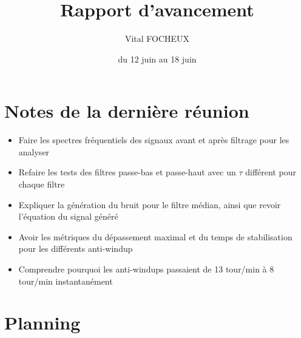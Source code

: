 \documentclass{article}
\title{Rapport d'avancement}
\author{Vital FOCHEUX}
\date{du 12 juin au 18 juin}
\begin{document}
\maketitle

\section{Notes de la dernière réunion}

\begin{itemize}
    \item Faire les spectres fréquentiels des signaux avant et après filtrage pour les analyser
    \item Refaire les tests des filtres passe-bas et passe-haut avec un $\tau$ différent pour chaque filtre
    \item Expliquer la génération du bruit pour le filtre médian, ainsi que revoir l'équation du signal généré
    \item Avoir les métriques du dépassement maximal et du temps de stabilisation pour les différents anti-windup
    \item Comprendre pourquoi les anti-windups passaient de 13 tour/min à 8 tour/min instantanément
\end{itemize}

\section{Planning}
\end{document}
